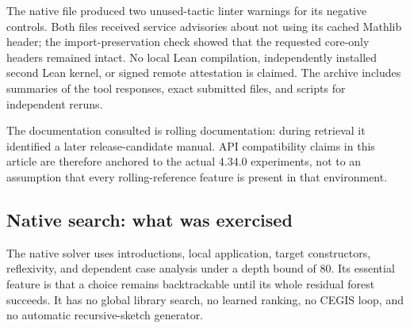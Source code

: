 The native file produced two unused-tactic linter warnings for its  negative controls. Both files received service advisories about not using its cached Mathlib header; the import-preservation check showed that the requested core-only headers remained intact. No local Lean compilation, independently installed second Lean kernel, or signed remote attestation is claimed. The archive includes summaries of the tool responses, exact submitted files, and scripts for independent reruns.

The documentation consulted is rolling documentation: during retrieval it identified a later release-candidate manual. API compatibility claims in this article are therefore anchored to the actual 4.34.0 experiments, not to an assumption that every rolling-reference feature is present in that environment.

\subsection{Native search: what was exercised}

The native solver uses introductions, local application, target constructors, reflexivity, and dependent case analysis under a depth bound of 80. Its essential feature is that a choice remains backtrackable until its whole residual forest succeeds. It has no global library search, no learned ranking, no CEGIS loop, and no automatic recursive-sketch generator.


